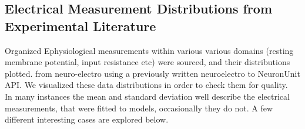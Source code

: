 \subsection{Electrical Measurement Distributions from Experimental Literature}\label{section:nelectro}

Organized Ephysiological measurements within various various domains (resting membrane potential, input resistance etc) were sourced, and their distributions plotted.  from neuro-electro  \cite{tripathy2014neuroelectro} using a previously written neuroelectro to NeuronUnit API. We visualized these data distributions in order to check them for quality.%
\\
In many instances the mean and standard deviation well describe the electrical measurements, that were fitted to models, occasionally they do not. A few different interesting cases are explored below.

